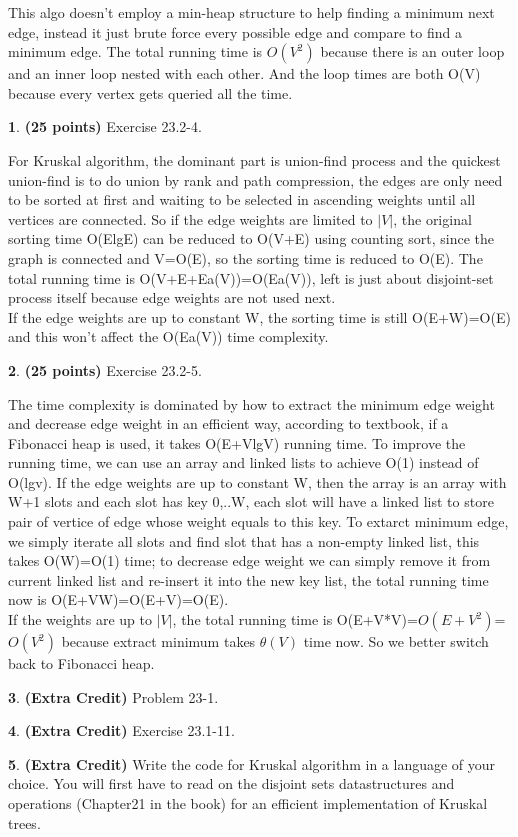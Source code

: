 \documentclass[11pt]{article}
\theoremstyle{definition}
\theoremstyle{theorem}
\newtheorem{prob}{}
\newcommand{\solution}{\medskip\noindent{\color{DarkBlue}\textbf{Solution:}}}
\begin{document}
This algo doesn't employ a min-heap structure to help finding a minimum next edge, instead it just brute force every possible edge and compare to find a minimum edge. The total running time is $O(V^2)$ because there is an outer loop and an inner loop nested with each other. And the loop times are both O(V) because every vertex gets queried all the time.
\begin{prob} \textbf{(25 points)} Exercise 23.2-4.
\end{prob}
\solution
For Kruskal algorithm, the dominant part is union-find process and the quickest union-find is to do union by rank and path compression, the edges are only need to be sorted at first and waiting to be selected in ascending weights until all vertices are connected. So if the edge weights are limited to $|V|$, the original sorting time O(ElgE) can be reduced to O(V+E) using counting sort, since the graph is connected and V=O(E), so the sorting time is reduced to O(E). The total running time is O(V+E+Ea(V))=O(Ea(V)), left is just about disjoint-set process itself because edge weights are not used next.\\If the edge weights are up to constant W, the sorting time is still O(E+W)=O(E) and this won't affect the O(Ea(V)) time complexity.
\begin{prob} \textbf{(25 points)} Exercise 23.2-5.
\end{prob}
\solution
The time complexity is dominated by how to extract the minimum edge weight and decrease edge weight in an efficient way, according to textbook, if a Fibonacci heap is used, it takes O(E+VlgV) running time. To improve the running time, we can use an array and linked lists to achieve O(1) instead of O(lgv). If the edge weights are up to constant W, then the array is an array with W+1 slots and each slot has key 0,..W, each slot will have a linked list to store pair of vertice of edge whose weight equals to this key. To extarct minimum edge, we simply iterate all slots and find slot that has a non-empty linked list, this takes O(W)=O(1) time; to decrease edge weight we can simply remove it from current linked list and re-insert it into the new key list, the total running time now is O(E+VW)=O(E+V)=O(E).\\If the weights are up to $|V|$, the total running time is O(E+V*V)=$O(E+V^2)$=$O(V^2)$ because extract minimum takes $\theta(V)$ time now. So we better switch back to Fibonacci heap.
\begin{prob} \textbf{(Extra Credit)} Problem 23-1.
\end{prob}
\solution

\begin{prob} \textbf{(Extra Credit)} Exercise 23.1-11.
\end{prob}
\solution

\begin{prob} \textbf{(Extra Credit)} Write the code for Kruskal algorithm in a language of your choice. You will first have to read on the disjoint sets datastructures and operations (Chapter21 in the book) for an efficient implementation of Kruskal trees.
\end{prob}
\solution
\end{document}
